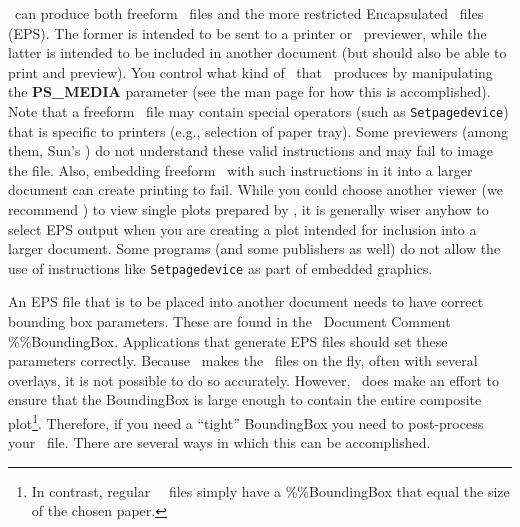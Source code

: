 \GMT\ can produce both freeform \PS\ files and the more restricted Encapsulated \PS\ files (EPS).  The former is intended to be sent to a printer or \PS\ previewer,
while the latter is intended to be included in another document (but should also be able to print and preview).  You control what kind of \PS\ that \GMT\ produces by
manipulating the \textbf{PS\_MEDIA} parameter (see the  man page for how this is accomplished).  Note that a freeform \PS\ file may contain special operators (such as \texttt{Setpagedevice}) that is specific to printers (e.g., selection of paper tray). Some previewers (among them, Sun's ) do not understand these valid instructions and may fail to image the file. Also, embedding freeform \PS\ with such instructions in it into a larger document can create printing to fail. While you could choose another viewer (we recommend ) to view single plots prepared by \GMT, it is generally wiser anyhow to select EPS output when you are creating a plot intended for inclusion into a larger document. Some programs (and some publishers as well) do not allow the use of instructions like \texttt{Setpagedevice} as part of embedded graphics.

An EPS file that is to be placed into another document needs to have correct bounding box parameters.  These are found in the \PS\ Document Comment \%\%BoundingBox.  Applications that generate EPS files should set these parameters correctly.  Because \GMT\
makes the \PS\ files on the fly, often with several overlays, it is not possible to do so accurately.  However, \GMT\ does make an effort to ensure that the BoundingBox is large enough to contain the entire composite plot\footnote{In contrast, regular \GMT\ \PS\ files simply have a \%\%BoundingBox that equal the size of the chosen paper.}. Therefore, if you need a ``tight'' BoundingBox you need to post-process your \PS\ file.  There are several ways in which this can be accomplished.

